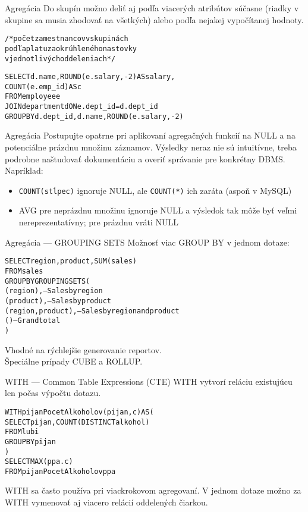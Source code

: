 \documentclass[12pt]{beamer}
\def\blue#1{\textcolor{Cerulean}{#1}}
\begin{document}
\begin{frame}[fragile]{Agregácia}
Do skupín možno deliť aj podľa viacerých atribútov súčasne (riadky v skupine sa musia zhodovať na všetkých) alebo podľa nejakej vypočítanej hodnoty.
\begin{alltt}
/* počet zamestnancov v skupinách
podľa platu zaokrúhleného na stovky
v jednotlivých oddeleniach */

SELECT d.name, ROUND(e.salary, -2) AS salary,
    \alert{COUNT}(e.emp_id) AS c
FROM employee e
    JOIN department d ON e.dept_id = d.dept_id
\alert{GROUP BY} d.dept_id, d.name, ROUND(e.salary, -2)
\end{alltt}
\end{frame}

\begin{frame}[fragile]{Agregácia}
Postupujte opatrne pri aplikovaní agregačných funkcií na NULL a na potenciálne prázdnu množinu záznamov.
Výsledky neraz nie sú intuitívne, treba podrobne naštudovať dokumentáciu a overiť správanie pre konkrétny DBMS.
Napríklad:
\begin{itemize}
\item \verb|COUNT(stĺpec)| ignoruje NULL, ale \verb|COUNT(*)| ich zaráta (aspoň v MySQL)
\item AVG pre neprázdnu množinu ignoruje NULL a výsledok tak môže byť veľmi nereprezentatívny; pre prázdnu vráti NULL
\end{itemize}
\end{frame}

\begin{frame}[fragile]{Agregácia --- GROUPING SETS}
Možnosť viac GROUP BY v jednom dotaze:
\begin{alltt}
SELECT region, product, SUM(sales)
FROM sales
GROUP BY \alert{GROUPING SETS} (
  (region),          --- Sales by region
  (product),         --- Sales by product
  (region, product), --- Sales by region and product
  ()                 --- Grand total
)
\end{alltt}
Vhodné na rýchlejšie generovanie reportov.\\
Špeciálne prípady CUBE a ROLLUP.
\end{frame}

\begin{frame}[fragile]{WITH --- Common Table Expressions (CTE)}
WITH vytvorí reláciu existujúcu len počas výpočtu dotazu.
\bigskip
\begin{alltt}
\alert{WITH} \blue{pijanPocetAlkoholov}(pijan, c) AS (
    SELECT pijan, COUNT(DISTINCT alkohol)
    FROM lubi
    GROUP BY pijan
)
SELECT MAX(ppa.c)
FROM \blue{pijanPocetAlkoholov} ppa
\end{alltt}
\bigskip
WITH sa často používa pri viackrokovom agregovaní.
V jednom dotaze možno za WITH vymenovať aj viacero relácií oddelených čiarkou.
\end{frame}
\end{document}
